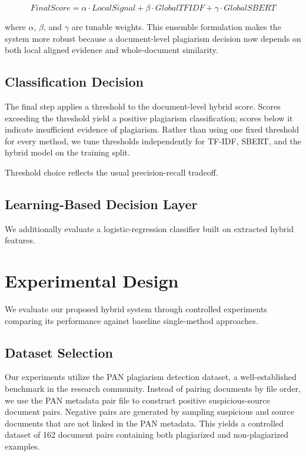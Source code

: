 \documentclass{llncs}
\begin{document}
\begin{equation}
FinalScore = \alpha \cdot LocalSignal + \beta \cdot GlobalTFIDF + \gamma \cdot GlobalSBERT
\end{equation}

where $\alpha$, $\beta$, and $\gamma$ are tunable weights. This ensemble formulation makes the system more robust because a document-level plagiarism decision now depends on both local aligned evidence and whole-document similarity.

\subsection{Classification Decision}

The final step applies a threshold to the document-level hybrid score. Scores exceeding the threshold yield a positive plagiarism classification; scores below it indicate insufficient evidence of plagiarism. Rather than using one fixed threshold for every method, we tune thresholds independently for TF-IDF, SBERT, and the hybrid model on the training split.

Threshold choice reflects the usual precision-recall tradeoff.

\subsection{Learning-Based Decision Layer}

We additionally evaluate a logistic-regression classifier built on extracted hybrid features.

\section{Experimental Design}

We evaluate our proposed hybrid system through controlled experiments comparing its performance against baseline single-method approaches.

\subsection{Dataset Selection}

Our experiments utilize the PAN plagiarism detection dataset, a well-established benchmark in the research community. Instead of pairing documents by file order, we use the PAN metadata pair file to construct positive suspicious-source document pairs. Negative pairs are generated by sampling suspicious and source documents that are not linked in the PAN metadata. This yields a controlled dataset of 162 document pairs containing both plagiarized and non-plagiarized examples.
\end{document}
